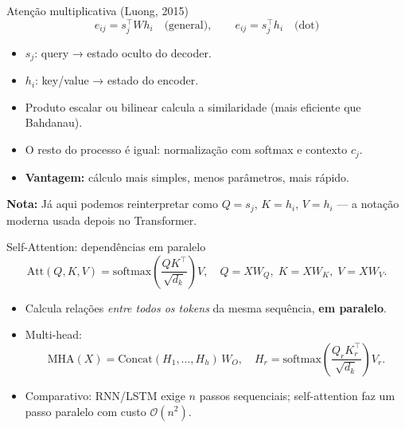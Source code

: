 \documentclass{beamer}
\begin{document}
\begin{frame}{Atenção multiplicativa (Luong, 2015)}
\[
e_{ij} = s_j^\top W h_i \quad \text{(general)}, \qquad
e_{ij} = s_j^\top h_i \quad \text{(dot)}
\]

\begin{itemize}
  \item $s_j$: query → estado oculto do decoder.
  \item $h_i$: key/value → estado do encoder.
  \item Produto escalar ou bilinear calcula a similaridade (mais eficiente que Bahdanau).
  \item O resto do processo é igual: normalização com softmax e contexto $c_j$.
  \item \textbf{Vantagem:} cálculo mais simples, menos parâmetros, mais rápido.
\end{itemize}

\textbf{Nota:} Já aqui podemos reinterpretar como $Q=s_j$, $K=h_i$, $V=h_i$ —  
a notação moderna usada depois no Transformer.
\end{frame}


\begin{frame}{Self-Attention: dependências em paralelo}
	\[
		\mathrm{Att}(Q,K,V)=\mathrm{softmax}\!\left(\frac{QK^\top}{\sqrt{d_k}}\right)V,
		\quad
		Q = XW_Q,\; K = XW_K,\; V = XW_V.
	\]
	\begin{itemize}
		\item Calcula relações \emph{entre todos os tokens} da mesma sequência, \textbf{em paralelo}.
		\item Multi-head:
		      \[
			      \mathrm{MHA}(X)=\mathrm{Concat}(H_1,\dots,H_h)\,W_O,\quad
			      H_r=\mathrm{softmax}\!\left(\frac{Q_r K_r^\top}{\sqrt{d_k}}\right)V_r.
		      \]
		\item Comparativo: RNN/LSTM exige $n$ passos sequenciais; self-attention faz um passo paralelo com custo $\mathcal{O}(n^2)$.
	\end{itemize}
\end{frame}
\end{document}
